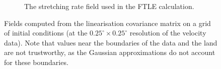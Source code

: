\begin{figure}
\begin{center}
\begin{subfigure}[t]{0.49\textwidth}
			\caption{The stretching rate field used in the FTLE calculation.}
		\end{subfigure}
		\caption{Fields computed from the linearisation covariance matrix on a grid of initial conditions (at the \(0.25^\circ \times 0.25^\circ\) resolution of the velocity data).
			Note that values near the boundaries of the data and the land are not trustworthy, as the Gaussian approximations do not account for these boundaries.}
		\label{fig:na_s2}
	\end{center}
\end{figure}




